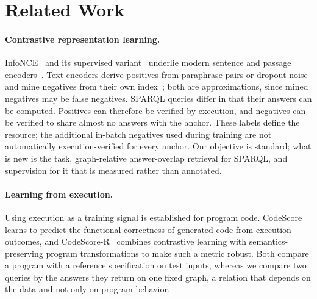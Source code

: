 \documentclass[runningheads]{llncs}
\begin{document}
\section{Related Work}
\label{sec:related}

\paragraph{Contrastive representation learning.}
InfoNCE~\cite{oord2018cpc} and its supervised
variant~\cite{khosla2020supcon} underlie modern sentence and passage
encoders~\cite{reimers2019sbert,gao2021simcse,karpukhin2020dpr,wang2022e5}.
Text encoders derive positives from paraphrase pairs or dropout
noise~\cite{gao2021simcse} and mine negatives from their own
index~\cite{xiong2021ance}; both are approximations, since mined negatives may
be false negatives. SPARQL queries differ in that their answers can be computed.
Positives can therefore be verified by execution, and negatives can be
verified to share almost no answers with the anchor. These labels define the
resource; the additional in-batch negatives used during training are not
automatically execution-verified for every anchor. Our objective is
standard; what is new is the task, graph-relative answer-overlap retrieval for
SPARQL, and supervision for it that is measured rather than annotated.

\paragraph{Learning from execution.}
Using execution as a training signal is established for program code.
CodeScore~\cite{dong2023codescore} learns to predict the functional
correctness of generated code from execution outcomes, and
CodeScore-R~\cite{yang2024codescorer} combines contrastive learning with
semantics-preserving program transformations to make such a metric robust.
Both compare a program with a reference specification on test inputs, whereas
we compare two queries by the answers they return on one fixed graph, a
relation that depends on the data and not only on program behavior.
\end{document}
